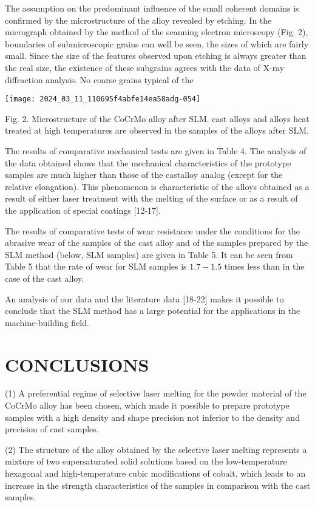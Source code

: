\documentclass[10pt]{article}
\begin{document}
The assumption on the predominant influence of the small coherent domains is confirmed by the microstructure of the alloy revealed by etching. In the micrograph obtained by the method of the scanning electron microscopy (Fig. 2), boundaries of submicroscopic grains can well be seen, the sizes of which are fairly small. Since the size of the features observed upon etching is always greater than the real size, the existence of these subgrains agrees with the data of $\mathrm{X}$-ray diffraction analysis. No coarse grains typical of the

\begin{center}
\texttt{[image: 2024\_03\_11\_110695f4abfe14ea58adg-054]}
\end{center}

Fig. 2. Microstructure of the CoCrMo alloy after SLM. cast alloys and alloys heat treated at high temperatures are observed in the samples of the alloys after SLM.

The results of comparative mechanical tests are given in Table 4. The analysis of the data obtained shows that the mechanical characteristics of the prototype samples are much higher than those of the castalloy analog (except for the relative elongation). This phenomenon is characteristic of the alloys obtained as a result of either laser treatment with the melting of the surface or as a result of the application of special coatings [12-17].

The results of comparative tests of wear resistance under the conditions for the abrasive wear of the samples of the cast alloy and of the samples prepared by the SLM method (below, SLM samples) are given in Table 5. It can be seen from Table 5 that the rate of wear for SLM samples is $1.7-1.5$ times less than in the case of the cast alloy.

An analysis of our data and the literature data [18-22] makes it possible to conclude that the SLM method has a large potential for the applications in the machine-building field.

\section*{CONCLUSIONS}
(1) A preferential regime of selective laser melting for the powder material of the CoCrMo alloy has been chosen, which made it possible to prepare prototype samples with a high density and shape precision not inferior to the density and precision of cast samples.

(2) The structure of the alloy obtained by the selective laser melting represents a mixture of two supersaturated solid solutions based on the low-temperature hexagonal and high-temperature cubic modifications of cobalt, which leads to an increase in the strength characteristics of the samples in comparison with the cast samples.
\end{document}
